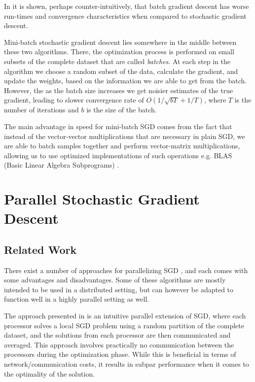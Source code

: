 \documentclass[11pt,a4paper]{article}
\begin{document}
In \cite{wilson2003general} it is shown, perhaps counter-intuitively, that batch gradient descent has
worse run-times and convergence characteristics when compared to stochastic gradient descent.

Mini-batch stochastic gradient descent lies somewhere in the middle between these two algorithms.
There, the optimization process is performed on small subsets of the complete dataset that are
called \textit{batches}. At each step in the algorithm we choose a random subset of the data,
calculate the gradient, and update the weights, based on the information we are able to get from
the batch. However, the as the batch size increases we get noisier estimates of the true gradient,
leading to slower convergence rate of $O(1/\sqrt{bT} + 1/T)$, where $T$ is the number of iterations
and $b$ is the size of the batch.

The main advantage in speed for mini-batch SGD comes from the fact that instead of the
vector-vector multiplications that are necessary in plain SGD, we are able to batch samples
together and perform vector-matrix multiplications, allowing us to use optimized implementations
of such operations e.g. BLAS (Basic Linear Algebra Subprograms) \cite{lawson1979basic}.

\section{Parallel Stochastic Gradient Descent}
\label{sec:psgd}
\subsection{Related Work}

There exist a number of approaches for parallelizing SGD \cite{zinkevich2010parallelized,
recht2011hogwild, dekel2012optimal}, and each comes with some advantages and disadvantages. Some of
these algorithms are mostly intended to be used in a distributed setting, but can however be
adapted to function well in a highly parallel setting as well.

The approach presented in \cite{zinkevich2010parallelized} is an intuitive parallel extension of
SGD, where each processor solves a local SGD problem using a random partition of the
complete dataset, and the solutions from each processor are then communicated and averaged. This
approach involves practically no communication between the processors during the optimization
phase. While this is beneficial in terms of network/communication costs, it results in subpar
performance when it comes to the optimality of the solution.
\end{document}
